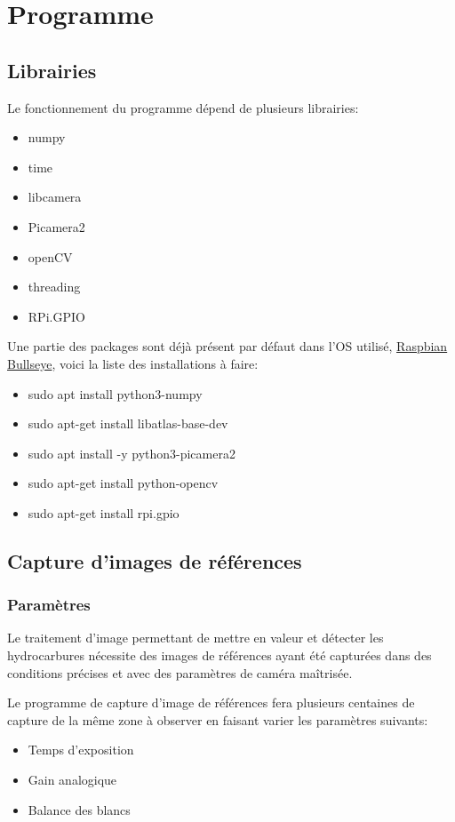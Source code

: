 \section{Programme}
\subsection{Librairies}
Le fonctionnement du programme dépend de plusieurs librairies:
\begin{itemize}
    \item numpy
    \item time
    \item libcamera
    \item Picamera2
    \item openCV
    \item threading
    \item RPi.GPIO
\end{itemize}
Une partie des packages sont déjà présent par défaut dans l'OS utilisé, \underline{Raspbian Bullseye}, voici la liste des installations à faire:
\begin{itemize}
    \item sudo apt install python3-numpy
    \item sudo apt-get install libatlas-base-dev
    \item sudo apt install -y python3-picamera2
    \item sudo apt-get install python-opencv
    \item sudo apt-get install rpi.gpio
\end{itemize}
\subsection{Capture d'images de références}
\subsubsection{Paramètres}
Le traitement d'image permettant de mettre en valeur et détecter les hydrocarbures nécessite des images de références ayant été capturées dans des conditions précises et avec des paramètres de caméra maîtrisée.

Le programme de capture d'image de références fera plusieurs centaines de capture de la même zone à observer en faisant varier les paramètres suivants:
\begin{itemize}
    \item Temps d'exposition
    \item Gain analogique
    \item Balance des blancs
\end{itemize}

